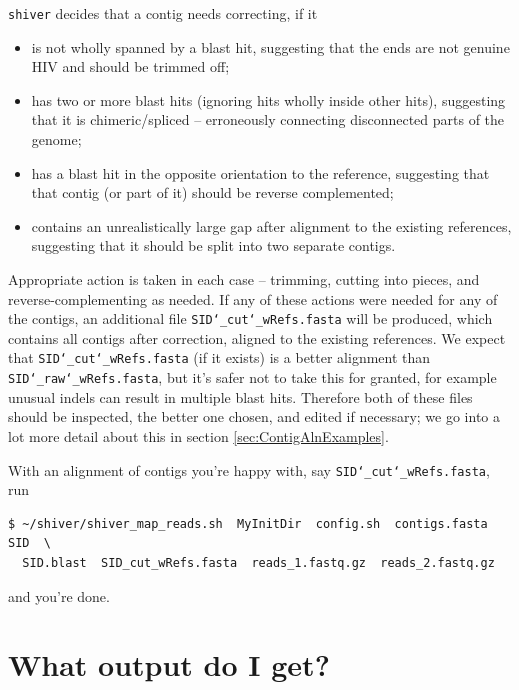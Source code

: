 \documentclass{article}
\newcommand{\shiv}{\c{shiver}\xspace}
\let\c\texttt
\begin{document}
\shiv decides that a contig needs correcting, if it
\begin{itemize}
 \item is not wholly spanned by a blast hit, suggesting that the ends are not genuine HIV and should be trimmed off;
 \item has two or more blast hits (ignoring hits wholly inside other hits), suggesting that it is chimeric/spliced -- erroneously connecting disconnected parts of the genome;
 \item has a blast hit in the opposite orientation to the reference, suggesting that that contig (or part of it) should be reverse complemented;
 \item contains an unrealistically large gap after alignment to the existing references, suggesting that it should be split into two separate contigs.
\end{itemize}
Appropriate action is taken in each case -- trimming, cutting into pieces, and reverse-complementing as needed.
If any of these actions were needed for any of the contigs, an additional file \c{SID\char`_cut\char`_wRefs.fasta} will be produced, which contains all contigs after correction, aligned to the existing references.
We expect that \c{SID\char`_cut\char`_wRefs.fasta} (if it exists) is a better alignment than \c{SID\char`_raw\char`_wRefs.fasta}, but it's safer not to take this for granted, for example unusual indels can result in multiple blast hits.
Therefore both of these files should be inspected, the better one chosen, and edited if necessary; we go into a lot more detail about this in section \ref{sec:ContigAlnExamples}.

With an alignment of contigs you're happy with, say \c{SID\char`_cut\char`_wRefs.fasta}, run
\begin{Verbatim}[samepage=true]
$ ~/shiver/shiver_map_reads.sh  MyInitDir  config.sh  contigs.fasta  SID  \
  SID.blast  SID_cut_wRefs.fasta  reads_1.fastq.gz  reads_2.fastq.gz
\end{Verbatim}
and you're done.

\section{What output do I get?}
\end{document}
